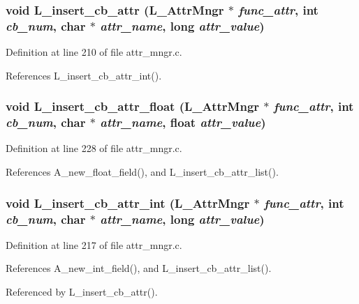 \subsubsection{\setlength{\rightskip}{0pt plus 5cm}void L\_\-insert\_\-cb\_\-attr (\bf{L\_\-Attr\-Mngr} $\ast$ {\em func\_\-attr}, int {\em cb\_\-num}, char $\ast$ {\em attr\_\-name}, long {\em attr\_\-value})}\label{attr__mngr_8h_bbb04f1c8e901782b4fe073cce7e94ed}




Definition at line 210 of file attr\_\-mngr.c.

References L\_\-insert\_\-cb\_\-attr\_\-int().
\subsubsection{\setlength{\rightskip}{0pt plus 5cm}void L\_\-insert\_\-cb\_\-attr\_\-float (\bf{L\_\-Attr\-Mngr} $\ast$ {\em func\_\-attr}, int {\em cb\_\-num}, char $\ast$ {\em attr\_\-name}, float {\em attr\_\-value})}\label{attr__mngr_8h_0ba3628179f76de97d2d617939a75998}




Definition at line 228 of file attr\_\-mngr.c.

References A\_\-new\_\-float\_\-field(), and L\_\-insert\_\-cb\_\-attr\_\-list().
\subsubsection{\setlength{\rightskip}{0pt plus 5cm}void L\_\-insert\_\-cb\_\-attr\_\-int (\bf{L\_\-Attr\-Mngr} $\ast$ {\em func\_\-attr}, int {\em cb\_\-num}, char $\ast$ {\em attr\_\-name}, long {\em attr\_\-value})}\label{attr__mngr_8h_7e670d1d8323b2629e941d20ae7d6f9a}




Definition at line 217 of file attr\_\-mngr.c.

References A\_\-new\_\-int\_\-field(), and L\_\-insert\_\-cb\_\-attr\_\-list().

Referenced by L\_\-insert\_\-cb\_\-attr().
